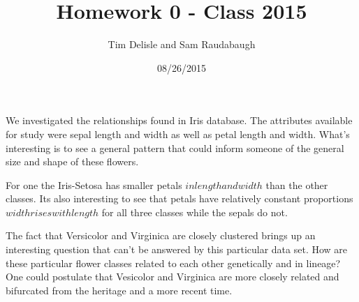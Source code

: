\documentclass[12pt]{report}
\begin{document}
\lstset{language=Python} 

\title{Homework 0 - Class 2015}
\author{Tim Delisle and Sam Raudabaugh}
\date{08/26/2015}
\maketitle




We investigated the relationships found in Iris database. The attributes available for study were sepal length and width as well as petal length and width. What's interesting is to see a general pattern that could inform someone of the general size and shape of these flowers. 

For one the Iris-Setosa has smaller petals \(in length and width\) than the other classes. Its also interesting to see that petals have relatively constant proportions \( width rises with length \)  for all three classes while the sepals do not. 

The fact that Versicolor and Virginica are closely clustered brings up an interesting question that can't be answered by this particular data set. How are these particular flower classes related to each other genetically and in lineage? One could postulate that Vesicolor and Virginica are more closely related and bifurcated from the heritage and a more recent time.
\end{document}
